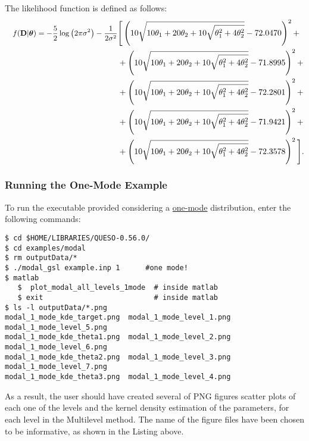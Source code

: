 The likelihood function is defined as follows:
\begin{equation}
\begin{split} \small
\quad f({\bf D}|\mbox{\boldmath$ \theta $})= -\dfrac{5}{2} \log\left(2 \pi \sigma^2\right)-\dfrac{1}{2\sigma^2} &\Bigg[
 \left(10 \sqrt{10 \theta_1+20 \theta_2+10 \sqrt{\theta_1^2+4 \theta_2^2}}-72.0470\right)^2 +\\
&+\left(10 \sqrt{10 \theta_1+20 \theta_2+10 \sqrt{\theta_1^2+4 \theta_2^2}}-71.8995\right)^2 +\\
&+\left(10 \sqrt{10 \theta_1+20 \theta_2+10 \sqrt{\theta_1^2+4 \theta_2^2}}-72.2801\right)^2 +\\
&+\left(10 \sqrt{10 \theta_1+20 \theta_2+10 \sqrt{\theta_1^2+4 \theta_2^2}}-71.9421\right)^2 +\\
&+\left(10 \sqrt{10 \theta_1+20 \theta_2+10 \sqrt{\theta_1^2+4 \theta_2^2}}-72.3578\right)^2 \Bigg].
\end{split}
\end{equation}

\subsubsection{Running the One-Mode Example}

To run the executable provided considering a \underline{one-mode} distribution, enter the following commands:
\begin{lstlisting}[label={},caption={Running the example with a one-mode distribution.}]
$ cd $HOME/LIBRARIES/QUESO-0.56.0/
$ cd examples/modal
$ rm outputData/*
$ ./modal_gsl example.inp 1      #one mode!
$ matlab
   $  plot_modal_all_levels_1mode  # inside matlab
   $ exit                          # inside matlab
$ ls -l outputData/*.png
modal_1_mode_kde_target.png  modal_1_mode_level_1.png  modal_1_mode_level_5.png
modal_1_mode_kde_theta1.png  modal_1_mode_level_2.png  modal_1_mode_level_6.png
modal_1_mode_kde_theta2.png  modal_1_mode_level_3.png  modal_1_mode_level_7.png
modal_1_mode_kde_theta3.png  modal_1_mode_level_4.png
\end{lstlisting}

As a result, the user should have created several of PNG figures scatter plots of each one of the levels and the kernel density estimation of the parameters, for each level in the Multilevel method. The name of the figure files have been chosen to be informative, as shown in the Listing above.




